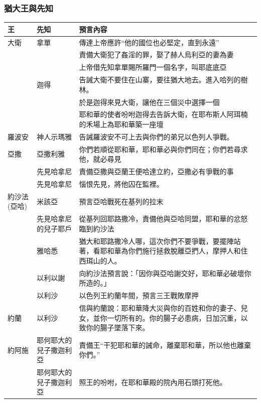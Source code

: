 \subsubsection{猶大王與先知}
\begin{table}[!hbp]
\centering
\begin{tabular}{|p{1.3cm}|p{2.5cm}|p{13cm}|}
\hline
\hline
 王  &先知 &預言內容\\\hline\hline
 大衛&拿單 &傳達上帝應許“他的國位也必堅定，直到永遠”\\\hline
 &  &責備大衛犯了姦淫的罪，娶了赫人烏利亞的妻為妻\\\hline
 &  &上帝借先知拿單賜所羅門一個名字，叫耶底底亞\\\hline
 &迦得  &告誡大衛不要住在山寨，要往猶大地去。進入哈列的樹林。\\\hline
 &  &於是迦得來見大衛，讓他在三個災中選擇一個 \\\hline
 &  &耶和華的使者吩咐迦得去告訴大衛，在耶布斯人阿珥楠的禾場上為耶和華築一座壇\\\hline
 羅波安& 神人示瑪雅 &告誡羅波安不可上去與你們的弟兄以色列人爭戰。\\\hline  
  亞撒  & 亞撒利雅  & 你們若順從耶和華，耶和華必與你們同在；你們若尋求他，就必尋見\\\hline 
    & 先見哈拿尼  & 責備亞撒與亞蘭王便哈達立約，亞撒必有爭戰的事\\\hline 
     & 先見哈拿尼  & 惱恨先見，將他囚在監裡。\\\hline 
  約沙法(亞哈) &米該亞 & 預言亞哈戰死在基列的拉末\\\hline 
    & 先見哈拿尼的兒子耶戶 & 從基列回耶路撒冷，責備他與亞哈同盟，耶和華的忿怒臨到約沙法 \\\hline 
      &雅哈悉  & 猶大和耶路撒冷人哪，這次你們不要爭戰，要擺陣站著，看耶和華為你們施行拯救脫離亞捫人，摩押人和住西珥山的人。 \\\hline 
        &以利以謝  & 向約沙法預言說：「因你與亞哈謝交好，耶和華必破壞你所造的。」 \\\hline 
    &以利沙& 以色列王約蘭年間，預言三王戰敗摩押 \\\hline 
  約蘭  &以利沙& 信與約蘭說：耶和華降大災與你的百姓和你的妻子、兒女，並你一切所有的。你的腸子必患病，日加沉重，以致你的腸子墜落下來。 \\\hline 
 約阿施 &耶何耶大的兒子撒迦利亞&責備王“干犯耶和華的誡命，離棄耶和華，所以他也離棄你們。”  \\\hline 
 &耶何耶大的兒子撒迦利亞&照王的吩咐，在耶和華殿的院內用石頭打死他。  \\\hline 

\end{tabular}
\end{table}
